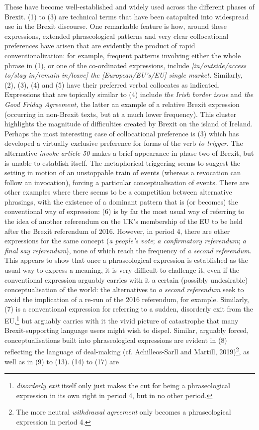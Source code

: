 \documentclass[12pt]{article}
\newenvironment{styleStandard}{\setlength\leftskip{0cm}\setlength\rightskip{0cm plus 1fil}\setlength\parindent{0cm}\setlength\parfillskip{0pt plus 1fil}\setlength\parskip{0in plus 1pt}\writerlistparindent\writerlistleftskip\leavevmode\normalfont\normalsize\writerlistlabel\ignorespaces}{\unskip\vspace{0.111in plus 0.0111in}\par}
\newcommand\writerlistleftskip{}
\newcommand\writerlistparindent{}
\newcommand\writerlistlabel{}
\begin{document}
\begin{styleStandard}
These have become well-established and widely used across the different phases of Brexit. (1) to (3) are technical terms that have been catapulted into widespread use in the Brexit discourse. One remarkable feature is how, around these expressions, extended phraseological patterns and very clear collocational preferences have arisen that are evidently the product of rapid conventionalization: for example, frequent patterns involving either the whole phrase in (1), or one of the co-ordinated expressions, include \textit{[in/outside/access to/stay in/remain in/leave] the [European/EU’s/EU] single market. }Similarly, (2), (3), (4) and (5) have their preferred verbal collocates as indicated. Expressions that are topically similar to (4) include \textit{the Irish border issue }and \textit{the Good Friday Agreement, }the latter an example of a relative Brexit expression (occurring in non-Brexit texts, but at a much lower frequency). This cluster highlights the magnitude of difficulties created by Brexit on the island of Ireland. Perhaps the most interesting case of collocational preference is (3) which has developed a virtually exclusive preference for forms of the verb \textit{to trigger}. The alternative\textit{ invoke article 50} makes a brief appearance in phase two of Brexit, but is unable to establish itself. The metaphorical triggering seems to suggest the setting in motion of an unstoppable train of events (whereas a revocation can follow an invocation), forcing a particular conceptualisation of events. There are other examples where there seems to be a competition between alternative phrasings, with the existence of a dominant pattern that is (or becomes) the conventional way of expression: (6) is by far the most usual way of referring to the idea of another referendum on the UK’s membership of the EU to be held after the Brexit referendum of 2016. However, in period 4, there are other expressions for the same concept (\textit{a people’s vote}; \textit{a confirmatory referendum};\textit{ a final say referendum}), none of which reach the frequency of \textit{a second referendum}. This appears to show that once a phraseological expression is established as the usual way to express a meaning, it is very difficult to challenge it, even if the conventional expression arguably carries with it a certain (possibly undesirable) conceptualisation of the world: the alternatives to \textit{a second referendum} seek to avoid the implication of a re-run of the 2016 referendum, for example. Similarly, (7) is a conventional expression for referring to a sudden, disorderly exit from the EU,\footnote{\textit{disorderly exit }itself only just makes the cut for being a phraseological expression in its own right in period 4, but in no other period.} but arguably carries with it the vivid picture of catastrophe that many Brexit-supporting language users might wish to dispel. Similar, arguably forced, conceptualisations built into phraseological expressions are evident in (8) reflecting the language of deal-making (cf. Achilleos-Sarll and Martill, 2019)\footnote{The more neutral \textit{withdrawal agreement} only becomes a phraseological expression in period 4.}, as well as in (9) to (13). (14) to (17) are 
\end{styleStandard}
\end{document}
